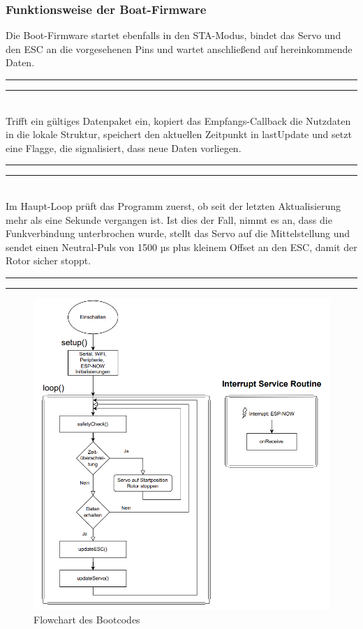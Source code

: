 \documentclass[a4paper,12pt]{article}
\begin{document}
\subsubsection{Funktionsweise der Boat-Firmware}
Die Boot-Firmware startet ebenfalls in den STA-Modus, bindet das Servo und den ESC an die vorgesehenen Pins und wartet anschließend auf hereinkommende Daten.
\newline\noindent\rule{\linewidth}{0.4pt}  %

\noindent\rule{\linewidth}{0.4pt}\\[0.5em]  %
Trifft ein gültiges Datenpaket ein, kopiert das Empfangs-Callback die Nutzdaten in die lokale Struktur, speichert den aktuellen Zeitpunkt in lastUpdate und setzt eine Flagge, die signalisiert, dass neue Daten vorliegen. 
\newline\noindent\rule{\linewidth}{0.4pt}  %

\noindent\rule{\linewidth}{0.4pt}\\[0.5em]  %
Im Haupt-Loop prüft das Programm zuerst, ob seit der letzten Aktualisierung mehr als eine Sekunde vergangen ist. Ist dies der Fall, nimmt es an, dass die Funkverbindung unterbrochen wurde, stellt das Servo auf die Mittelstellung und sendet einen Neutral-Puls von 1500 µs plus kleinem Offset an den ESC, damit der Rotor sicher stoppt.
\newline\noindent\rule{\linewidth}{0.4pt}  %

\noindent\rule{\linewidth}{0.4pt}  %
\begin{figure}[H]
    \centering
    \includegraphics[width=0.9\linewidth]{images/boatFlowchart.png}
    \caption{Flowchart des Bootcodes}
    \label{Boat-Flowchart}
\end{figure}
\end{document}
